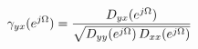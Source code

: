 \documentclass[preview]{standalone}
\begin{document}
\begin{align*}
\special{dvisvgm:raw <g id='unique000'>}\gamma_{yx}(e^{j\Omega}) = \frac{D_{yx}(e^{j\Omega})}{\sqrt{D_{yy}(e^{j\Omega})\,D_{xx}(e^{j\Omega})}}\special{dvisvgm:raw </g>}
\end{align*}
\end{document}
